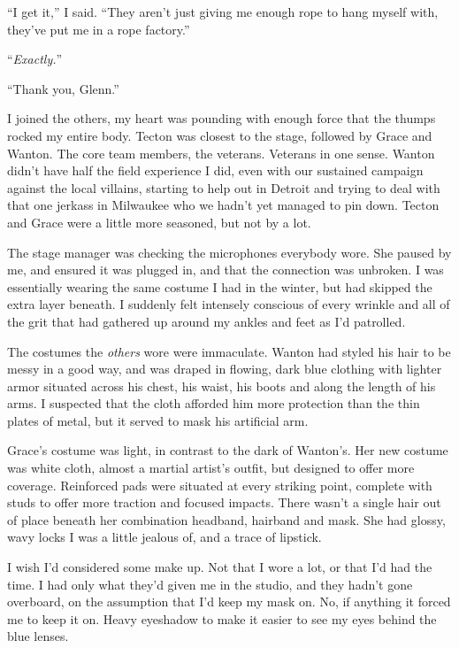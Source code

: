 ``I get it,'' I said.  ``They aren't just giving me enough rope to hang myself with, they've put me in a rope factory.''



``\emph{Exactly.}''



``Thank you, Glenn.''



I joined the others, my heart was pounding with enough force that the thumps rocked my entire body.  Tecton was closest to the stage, followed by Grace and Wanton.  The core team members, the veterans.  Veterans in one sense.  Wanton didn't have half the field experience I did, even with our sustained campaign against the local villains, starting to help out in Detroit and trying to deal with that one jerkass in Milwaukee who we hadn't yet managed to pin down.  Tecton and Grace were a little more seasoned, but not by a lot.



The stage manager was checking the microphones everybody wore.  She paused by me, and ensured it was plugged in, and that the connection was unbroken.  I was essentially wearing the same costume I had in the winter, but had skipped the extra layer beneath.  I suddenly felt intensely conscious of every wrinkle and all of the grit that had gathered up around my ankles and feet as I'd patrolled.



The costumes the \emph{others} wore were immaculate.  Wanton had styled his hair to be messy in a good way, and was draped in flowing, dark blue clothing with lighter armor situated across his chest, his waist, his boots and along the length of his arms.  I suspected that the cloth afforded him more protection than the thin plates of metal, but it served to mask his artificial arm.



Grace's costume was light, in contrast to the dark of Wanton's.  Her new costume was white cloth, almost a martial artist's outfit, but designed to offer more coverage.  Reinforced pads were situated at every striking point, complete with studs to offer more traction and focused impacts.  There wasn't a single hair out of place beneath her combination headband, hairband and mask.  She had glossy, wavy locks I was a little jealous of, and a trace of lipstick.



I wish I'd considered some make up.  Not that I wore a lot, or that I'd had the time.  I had only what they'd given me in the studio, and they hadn't gone overboard, on the assumption that I'd keep my mask on.  No, if anything it forced me to keep it on.  Heavy eyeshadow to make it easier to see my eyes behind the blue lenses.



